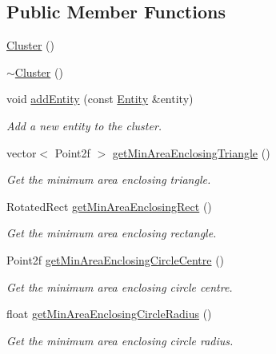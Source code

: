 \subsection*{\-Public \-Member \-Functions}
\begin{DoxyCompactItemize}
\item 
\hyperlink{classmultiscale_1_1analysis_1_1Cluster_aee7feb1d599d4c8fda6c3ee83e86ba81}{\-Cluster} ()
\item 
\hyperlink{classmultiscale_1_1analysis_1_1Cluster_a4bddfc88ac859610acab15dd12851b58}{$\sim$\-Cluster} ()
\item 
void \hyperlink{classmultiscale_1_1analysis_1_1Cluster_a2bc85629ab2bd6d01c6d2df3d79ba497}{add\-Entity} (const \hyperlink{classmultiscale_1_1analysis_1_1Entity}{\-Entity} \&entity)
\begin{DoxyCompactList}\small\item\em \-Add a new entity to the cluster. \end{DoxyCompactList}\item 
vector$<$ \-Point2f $>$ \hyperlink{classmultiscale_1_1analysis_1_1Cluster_ab28150a739c35d66874c219fd38b462b}{get\-Min\-Area\-Enclosing\-Triangle} ()
\begin{DoxyCompactList}\small\item\em \-Get the minimum area enclosing triangle. \end{DoxyCompactList}\item 
\-Rotated\-Rect \hyperlink{classmultiscale_1_1analysis_1_1Cluster_a6417e3328622a848a7dedeebb5821750}{get\-Min\-Area\-Enclosing\-Rect} ()
\begin{DoxyCompactList}\small\item\em \-Get the minimum area enclosing rectangle. \end{DoxyCompactList}\item 
\-Point2f \hyperlink{classmultiscale_1_1analysis_1_1Cluster_a4d93f85faf929336818248e1fd604fb6}{get\-Min\-Area\-Enclosing\-Circle\-Centre} ()
\begin{DoxyCompactList}\small\item\em \-Get the minimum area enclosing circle centre. \end{DoxyCompactList}\item 
float \hyperlink{classmultiscale_1_1analysis_1_1Cluster_aecf5fa56fa21e3b22130242694be744f}{get\-Min\-Area\-Enclosing\-Circle\-Radius} ()
\begin{DoxyCompactList}\small\item\em \-Get the minimum area enclosing circle radius. \end{DoxyCompactList}\item 

\end{DoxyCompactItemize}
